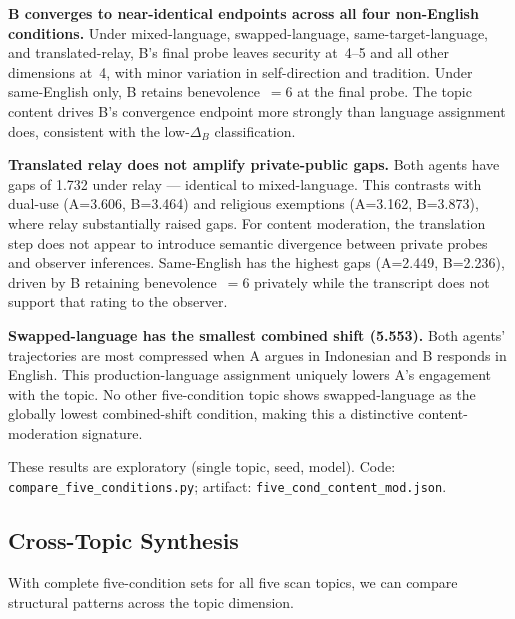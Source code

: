 \documentclass{article}
\begin{document}
\textbf{B converges to near-identical endpoints across all four non-English conditions.} Under mixed-language, swapped-language, same-target-language, and translated-relay, B's final probe leaves security at~4--5 and all other dimensions at~4, with minor variation in self-direction and tradition. Under same-English only, B retains benevolence~$=6$ at the final probe. The topic content drives B's convergence endpoint more strongly than language assignment does, consistent with the low-$\Delta_B$ classification.

\textbf{Translated relay does not amplify private-public gaps.} Both agents have gaps of 1.732 under relay --- identical to mixed-language. This contrasts with dual-use (A=3.606, B=3.464) and religious exemptions (A=3.162, B=3.873), where relay substantially raised gaps. For content moderation, the translation step does not appear to introduce semantic divergence between private probes and observer inferences. Same-English has the highest gaps (A=2.449, B=2.236), driven by B retaining benevolence~$=6$ privately while the transcript does not support that rating to the observer.

\textbf{Swapped-language has the smallest combined shift (5.553).} Both agents' trajectories are most compressed when A argues in Indonesian and B responds in English. This production-language assignment uniquely lowers A's engagement with the topic. No other five-condition topic shows swapped-language as the globally lowest combined-shift condition, making this a distinctive content-moderation signature.

These results are exploratory (single topic, seed, model). Code: \texttt{compare\_five\_conditions.py}; artifact: \texttt{five\_cond\_content\_mod.json}.

\subsection{Cross-Topic Synthesis}
\label{sec:cross-topic}

With complete five-condition sets for all five scan topics, we can compare structural patterns across the topic dimension.
\end{document}
